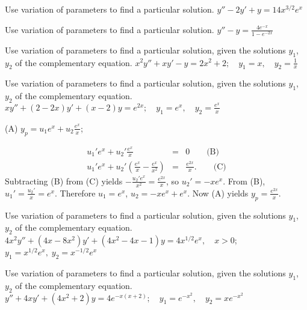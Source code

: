 \documentclass{ximera}
\begin{document}
\begin{problem}\label{exer:5.7.5} Use variation of parameters to find a particular solution. $y''-2y'+y=14x^{3/2}e^x$
\end{problem}

\begin{problem}\label{exer:5.7.6} Use variation of parameters to find a particular solution. $y''-y=\frac{4e^{-x}}{1-e^{-2x}}$
\end{problem}

\begin{problem}\label{exer:5.7.7}
Use variation
of parameters to find a particular solution, given the solutions
$y_1$, $y_2$ of the complementary equation. $x^2y''+xy'- y=2x^2+2;   \quad y_1=x,
\quad y_2=\frac{1}{x}$
\end{problem}

\begin{problem}\label{exer:5.7.8}
Use variation
of parameters to find a particular solution, given the solutions
$y_1$, $y_2$ of the complementary equation. $xy''+(2-2x)y'+(x-2)y=e^{2x};   \quad y_1=e^x,
\quad y_2=\frac{e^x}{x}$

\begin{solution}
(A) $y_p=u_1e^x+u_2\frac{e^x}{x}$;

\begin{eqnarray*}
u_1'e^x+u_2'\frac{e^x}{x}&=&0\qquad\text{(B)}\\ %
u_1'e^x+u_2'\left(\frac{e^x}{x}-\frac{e^x}{x^2}\right)&=&\frac{e^{2x}}{x}.\qquad\text{(C)} %
\end{eqnarray*}
Subtracting (B) from (C) yields
$-\frac{u_2'e^x}{x^2}=\frac{e^{2x}}{x}$, so $u_2'=-xe^x$. From
(B), $u_1'=\frac{u_2'}{x}=e^x$. Therefore
$u_1=e^x$, $u_2=-xe^x+e^x$. Now (A) yields $y_p=\frac{e^{2x}}{x}$.
\end{solution}
\end{problem}

\begin{problem}\label{exer:5.7.9}
Use variation
of parameters to find a particular solution, given the solutions
$y_1$, $y_2$ of the complementary equation. $4x^2y''+(4x-8x^2)y'+(4x^2-4x-1)y=4x^{1/2}e^x, \quad   x > 0$;
\newline $y_1=x^{1/2} e^x,\;  y_2=x^{-1/2}e^x$
\end{problem}

\begin{problem}\label{exer:5.7.10}
Use variation
of parameters to find a particular solution, given the solutions
$y_1$, $y_2$ of the complementary equation. $y''+4xy'+(4x^2+2)y=4e^{-x(x+2)};\quad   y_1=e^{-x^2},
\quad y_2=xe^{-x^2}$
\end{problem}
\end{document}
